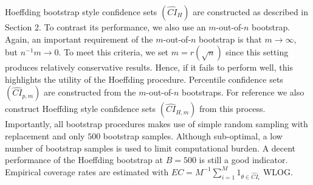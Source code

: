\documentclass[12pt]{amsart}
\theoremstyle{plain}%
\theoremstyle{definition}
\theoremstyle{remark}
\numberwithin{equation}{section}
\begin{document}
Hoeffding bootstrap style confidence sets $(\hat{CI}_H)$ are constructed as described in Section 2. To contrast its performance, we also use an $m$-out-of-$n$ bootstrap. Again, an important requirement of the $m$-out-of-$n$ bootstrap is that $m \to \infty$, but $n^{-1}m \to 0$. To meet this criteria, we set $m = r(\sqrt{n})$ since this setting produces relatively conservative results. Hence, if it fails to perform well, this highlights the utility of the Hoeffding procedure. Percentile confidence sets $(\hat{CI}_{p, m})$ are constructed from the $m$-out-of-$n$ bootstraps. For reference we also construct Hoeffding style confidence sets $(\hat{CI}_{H, m})$ from this process. Importantly, all bootstrap procedures makes use of simple random sampling with replacement and only $500$ bootstrap samples. Although sub-optimal, a low number of bootstrap samples is used to limit computational burden. A decent performance of the Hoeffding bootstrap at $B=500$ is still a good indicator. Empirical coverage rates are estimated with $EC = M^{-1} \sum_{i=1}^M 1_{\theta \in \hat{CI}_i}$ WLOG.
\end{document}
